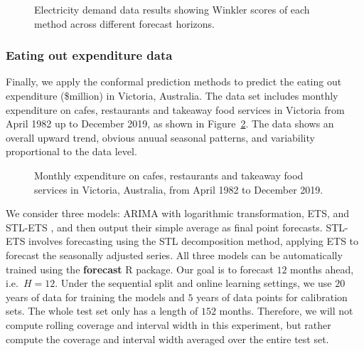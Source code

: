 \documentclass[
  11pt,
  a4paper,
]{article}
\theoremstyle{plain}
\theoremstyle{plain}
\theoremstyle{remark}
\begin{document}
\begin{figure}


\caption{\label{fig-elec_winkler}Electricity demand data results showing
Winkler scores of each method across different forecast horizons.}

\end{figure}%

\subsubsection{Eating out expenditure
data}\label{eating-out-expenditure-data}

Finally, we apply the conformal prediction methods to predict the eating
out expenditure (\$million) in Victoria, Australia. The data set
includes monthly expenditure on cafes, restaurants and takeaway food
services in Victoria from April 1982 up to December 2019, as shown in
Figure~\ref{fig-cafe_data}. The data shows an overall upward trend,
obvious anuual seasonal patterns, and variability proportional to the
data level.

\begin{figure}


\caption{\label{fig-cafe_data}Monthly expenditure on cafes, restaurants
and takeaway food services in Victoria, Australia, from April 1982 to
December 2019.}

\end{figure}%

We consider three models: ARIMA with logarithmic transformation, ETS,
and STL-ETS \autocite{hyndman2021}, and then output their simple average
as final point forecasts. STL-ETS involves forecasting using the STL
decomposition method, applying ETS to forecast the seasonally adjusted
series. All three models can be automatically trained using the
\textbf{forecast} R package. Our goal is to forecast \(12\) months
ahead, i.e.~\(H=12\). Under the sequential split and online learning
settings, we use \(20\) years of data for training the models and \(5\)
years of data points for calibration sets. The whole test set only has a
length of \(152\) months. Therefore, we will not compute rolling
coverage and interval width in this experiment, but rather compute the
coverage and interval width averaged over the entire test set.
\end{document}

